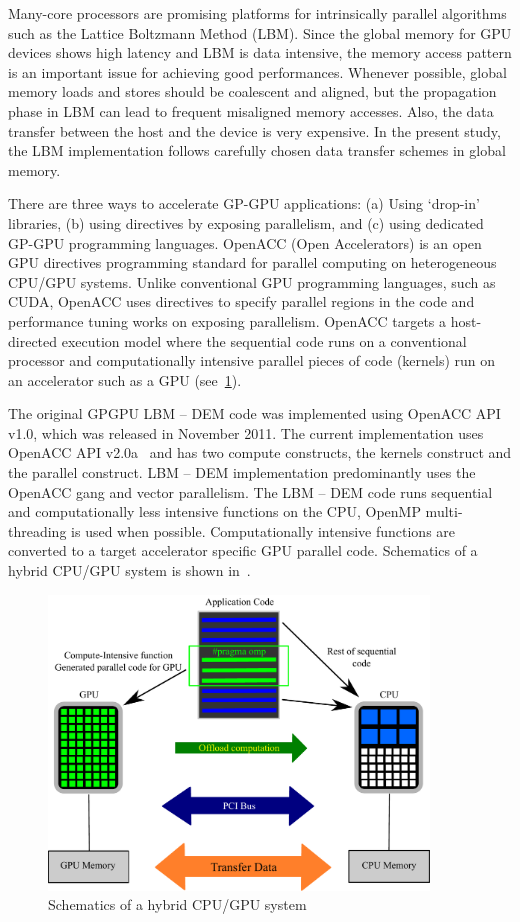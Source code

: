 Many-core processors are promising platforms for intrinsically parallel 
algorithms such as the Lattice Boltzmann Method (LBM). Since the global memory 
for GPU devices shows high latency and LBM is data intensive, the
memory access pattern is an important issue for achieving good performances. 
Whenever possible, global memory loads and stores should be coalescent and 
aligned, but the propagation phase in LBM can lead to frequent misaligned 
memory accesses. Also, the data transfer between the host and the device is 
very expensive. In the present study, the LBM implementation follows carefully 
chosen data transfer schemes in global memory.

There are three ways to accelerate GP-GPU applications: (a) Using `drop-in' 
libraries, (b) using directives by exposing parallelism, and (c) using 
dedicated GP-GPU programming languages. OpenACC (Open Accelerators) is an open 
GPU directives programming standard for parallel computing on heterogeneous 
CPU/GPU systems. Unlike conventional GPU programming languages, such as CUDA, 
OpenACC uses directives to specify parallel regions in the code and performance 
tuning works on exposing parallelism. OpenACC targets a host-directed execution 
model where the sequential code runs on a conventional processor and 
computationally intensive parallel pieces of code (kernels) run on an 
accelerator such as a GPU (see~\cref{fig:GPUConcept}). 

The original GPGPU LBM -- DEM code was implemented using OpenACC API v1.0, 
which was released in November 2011. The current implementation uses 
OpenACC API v2.0a~\citep{OpenACCmembers2013} and has two compute 
constructs, the kernels construct and the parallel construct. LBM -- DEM 
implementation predominantly uses the OpenACC gang and vector parallelism. The 
LBM -- DEM code runs sequential and computationally less intensive 
functions on the CPU, OpenMP multi-threading is used when possible. 
Computationally intensive functions are converted to a target accelerator 
specific GPU parallel code. Schematics of a hybrid CPU/GPU system is shown 
in~.

\begin{figure}[tbhp]
	\centering
	\includegraphics[width=0.9\textwidth]{GPU_Concept}
	\caption{Schematics of a hybrid CPU/GPU system}
	\label{fig:GPUConcept}
\end{figure}

